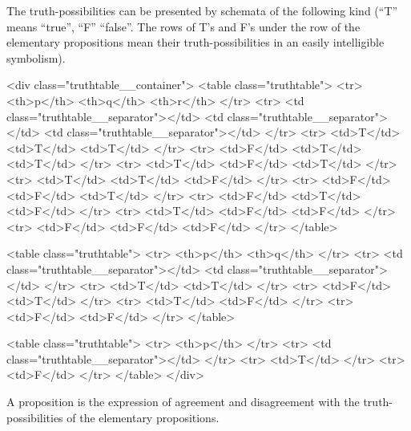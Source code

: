 {The truth-possibilities can be presented by
schemata of the following kind (``T'' means
``true'', ``F'' ``false''. The rows of T's and F's
under the row of the elementary propositions mean
their truth-possibilities in an easily intelligible
symbolism).

<div class="truthtable__container">
    <table class="truthtable">
        <tr>
            <th>p</th>
            <th>q</th>
            <th>r</th>
        </tr>
        <tr>
            <td class="truthtable__separator"></td>
            <td class="truthtable__separator"></td>
            <td class="truthtable__separator"></td>
        </tr>
        <tr>
            <td>T</td>
            <td>T</td>
            <td>T</td>
        </tr>
        <tr>
            <td>F</td>
            <td>T</td>
            <td>T</td>
        </tr>
        <tr>
            <td>T</td>
            <td>F</td>
            <td>T</td>
        </tr>
        <tr>
            <td>T</td>
            <td>T</td>
            <td>F</td>
        </tr>
        <tr>
            <td>F</td>
            <td>F</td>
            <td>T</td>
        </tr>
        <tr>
            <td>F</td>
            <td>T</td>
            <td>F</td>
        </tr>
        <tr>
            <td>T</td>
            <td>F</td>
            <td>F</td>
        </tr>
        <tr>
            <td>F</td>
            <td>F</td>
            <td>F</td>
        </tr>
    </table>

    <table class="truthtable">
        <tr>
            <th>p</th>
            <th>q</th>
        </tr>
        <tr>
            <td class="truthtable__separator"></td>
            <td class="truthtable__separator"></td>
        </tr>
        <tr>
            <td>T</td>
            <td>T</td>
        </tr>
        <tr>
            <td>F</td>
            <td>T</td>
        </tr>
        <tr>
            <td>T</td>
            <td>F</td>
        </tr>
        <tr>
            <td>F</td>
            <td>F</td>
        </tr>
    </table>

    <table class="truthtable">
        <tr>
            <th>p</th>
        </tr>
        <tr>
            <td class="truthtable__separator"></td>
        </tr>
        <tr>
            <td>T</td>
        </tr>
        <tr>
            <td>F</td>
        </tr>
    </table>
</div>

}


{A proposition is the expression of agreement
and disagreement with the truth-pos\-si\-bil\-i\-ties of
the elementary propositions.}


